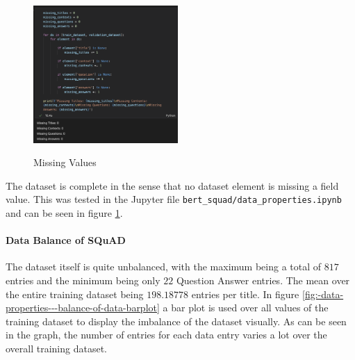                 \begin{figure}
             
                    \caption{Missing Values}
                    \includegraphics[width=0.49\textwidth]{figures/data_prop_no_missing_elements.png}
                    \label{fig:-data-properties---no-missing-values}
                \end{figure}

                The dataset is complete in the sense that no dataset element is missing a field value. This was tested in the Jupyter file \texttt{bert\_squad/data\_properties.ipynb} and can be seen in figure \ref{fig:-data-properties---no-missing-values}.

            
            \paragraph{Data Balance of SQuAD}
            \label{par:-data-properties---balance-of-data}

                The dataset itself is quite unbalanced, with the maximum being a total of $817$ entries and the minimum being only $22$ Question Answer entries. 
                The mean over the entire training dataset being $198.18778$ entries per title.
                In figure \ref{fig:-data-properties---balance-of-data-barplot} a bar plot is used over all values of the training dataset to display the imbalance of the dataset visually.
                As can be seen in the graph, the number of entries for each data entry varies a lot over the overall training dataset.

